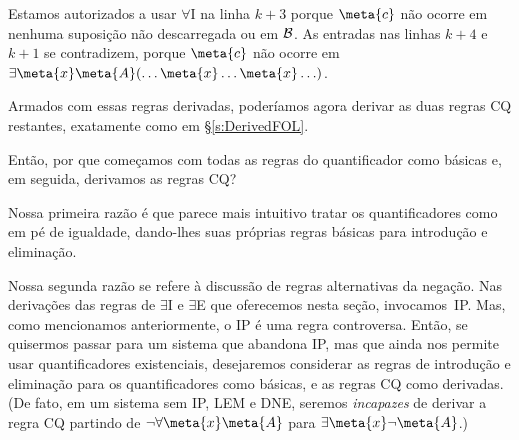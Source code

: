 Estamos autorizados a usar $\forall$I na linha $k+3$ porque $\meta{c}$ não ocorre em nenhuma suposição não descarregada ou em $\mathcal{B}$. As entradas nas linhas $k+4$ e $k+1$ se contradizem, porque $\meta{c}$ não ocorre em $\exists \meta{x} \meta{A} (\ldots \meta{x} \ldots \meta{x} \ldots)$.

Armados com essas regras derivadas, poderíamos agora derivar as duas regras CQ restantes, exatamente como em \S\ref{s:DerivedFOL}.

Então, por que começamos com todas as regras do quantificador como básicas e, em seguida, derivamos as regras CQ?

Nossa primeira razão é que parece mais intuitivo tratar os quantificadores como em pé de igualdade, dando-lhes suas próprias regras básicas para introdução e eliminação.

Nossa segunda razão se refere à discussão de regras alternativas da negação. Nas derivações das regras de $\exists$I e $ \exists$E que oferecemos nesta seção, invocamos~IP. Mas, como mencionamos anteriormente, o IP é uma regra controversa. Então, se quisermos passar para um sistema que abandona IP, mas que ainda nos permite usar quantificadores existenciais, desejaremos considerar as regras de introdução e eliminação para os quantificadores como básicas, e as regras CQ como derivadas. (De fato, em um sistema sem IP, LEM e DNE, seremos \emph{incapazes} de derivar a regra CQ partindo de $\enot \forall \meta{x} \meta{A}$ para $\exists \meta{x} \enot \meta{A}$.) 